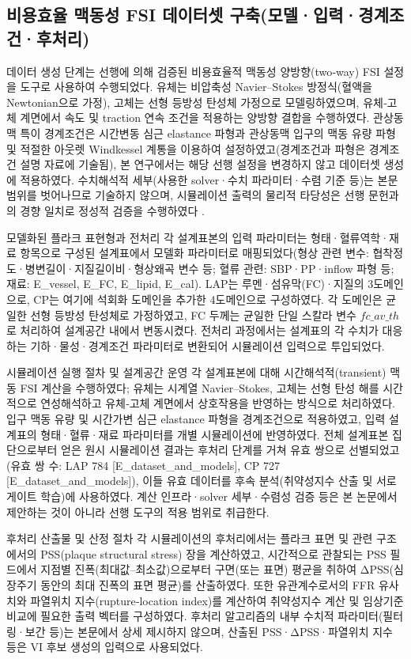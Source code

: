 \documentclass[preprint,12pt]{elsarticle}
\begin{document}
\subsection{비용효율 맥동성 FSI 데이터셋 구축(모델·입력·경계조건·후처리)}
데이터 생성 단계는 선행에 의해 검증된 비용효율적 맥동성 양방향(two‑way) FSI 설정을 도구로 사용하여 수행되었다. 유체는 비압축성 Navier–Stokes 방정식(혈액을 Newtonian으로 가정), 고체는 선형 등방성 탄성체 가정으로 모델링하였으며, 유체‑고체 계면에서 속도 및 traction 연속 조건을 적용하는 양방향 결합을 수행하였다. 관상동맥 특이 경계조건은 시간변동 심근 elastance 파형과 관상동맥 입구의 맥동 유량 파형 및 적절한 아웃렛 Windkessel 계통을 이용하여 설정하였고(경계조건과 파형은 경계조건 설명 자료에 기술됨), 본 연구에서는 해당 선행 설정을 변경하지 않고 데이터셋 생성에 적용하였다. 수치해석적 세부(사용한 solver·수치 파라미터·수렴 기준 등)는 본문 범위를 벗어나므로 기술하지 않으며, 시뮬레이션 출력의 물리적 타당성은 선행 문헌과의 경향 일치로 정성적 검증을 수행하였다 \cite{chaichana2012}. 

모델화된 플라크 표현형과 전처리
각 설계표본의 입력 파라미터는 형태·혈류역학·재료 항목으로 구성된 설계표에서 모델화 파라미터로 매핑되었다(형상 관련 변수: 협착정도·병변길이·지질길이비·형상왜곡 변수 등; 혈류 관련: SBP·PP·inflow 파형 등; 재료: E\_vessel, E\_FC, E\_lipid, E\_cal). LAP는 루멘·섬유막(FC)·지질의 3도메인으로, CP는 여기에 석회화 도메인을 추가한 4도메인으로 구성하였다. 각 도메인은 균일한 선형 등방성 탄성체로 가정하였고, FC 두께는 균일한 단일 스칼라 변수 $fc\_av\_th$로 처리하여 설계공간 내에서 변동시켰다. 전처리 과정에서는 설계표의 각 수치가 대응하는 기하·물성·경계조건 파라미터로 변환되어 시뮬레이션 입력으로 투입되었다. 

시뮬레이션 실행 절차 및 설계공간 운영
각 설계표본에 대해 시간해석적(transient) 맥동 FSI 계산을 수행하였다; 유체는 시계열 Navier–Stokes, 고체는 선형 탄성 해를 시간적으로 연성해석하고 유체‑고체 계면에서 상호작용을 반영하는 방식으로 처리하였다. 입구 맥동 유량 및 시간가변 심근 elastance 파형을 경계조건으로 적용하였고, 입력 설계표의 형태·혈류·재료 파라미터를 개별 시뮬레이션에 반영하였다. 전체 설계표본 집단으로부터 얻은 원시 시뮬레이션 결과는 후처리 단계를 거쳐 유효 쌍으로 선별되었고(유효 쌍 수: LAP 784 [E\_dataset\_and\_models], CP 727 [E\_dataset\_and\_models]), 이들 유효 데이터를 후속 분석(취약성지수 산출 및 서로게이트 학습)에 사용하였다. 계산 인프라·solver 세부·수렴성 검증 등은 본 논문에서 제안하는 것이 아니라 선행 도구의 적용 범위로 취급한다. 

후처리 산출물 및 산정 절차
각 시뮬레이션의 후처리에서는 플라크 표면 및 관련 구조에서의 PSS(plaque structural stress) 장을 계산하였고, 시간적으로 관찰되는 PSS 필드에서 지점별 진폭(최대값–최소값)으로부터 구면(또는 표면) 평균을 취하여 ΔPSS(심장주기 동안의 최대 진폭의 표면 평균)를 산출하였다. 또한 유관계수로서의 FFR 유사치와 파열위치 지수(rupture‑location index)를 계산하여 취약성지수 계산 및 임상기준 비교에 필요한 출력 벡터를 구성하였다. 후처리 알고리즘의 내부 수치적 파라미터(필터링·보간 등)는 본문에서 상세 제시하지 않으며, 산출된 PSS·ΔPSS·파열위치 지수 등은 VI 후보 생성의 입력으로 사용되었다. 
\end{document}
